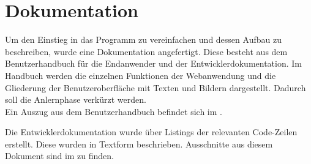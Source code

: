 \section{Dokumentation}
\label{sec:Dokumentation}
Um den Einstieg in das Programm zu vereinfachen und dessen Aufbau zu beschreiben,
wurde eine Dokumentation angefertigt. Diese besteht aus dem Benutzerhandbuch für
die Endanwender und der Entwicklerdokumentation. Im Handbuch werden die einzelnen
Funktionen der Webanwendung und die Gliederung der Benutzeroberfläche mit Texten
und Bildern dargestellt. Dadurch soll die Anlernphase verkürzt werden.\\
Ein Auszug aus dem Benutzerhandbuch befindet sich im .

Die Entwicklerdokumentation wurde über Listings der relevanten Code-Zeilen erstellt.
Diese wurden in Textform beschrieben. Ausschnitte aus diesem
Dokument sind im  zu finden.

